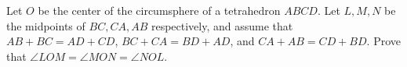 Let $O$ be the center of the circumsphere of a tetrahedron $ABCD$. Let $L, M, N$ be the midpoints of $BC, CA, AB$ respectively, and assume that $AB + BC = AD + CD$, $BC + CA = BD + AD$, and $CA + AB = CD + BD$. Prove that $\angle LOM = \angle MON = \angle NOL$.
